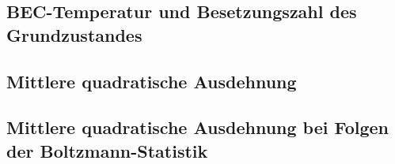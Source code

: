 \subsection{BEC-Temperatur und Besetzungszahl des Grundzustandes}

\fehlt

\subsection{Mittlere quadratische Ausdehnung}

\fehlt

\subsection{Mittlere quadratische Ausdehnung bei Folgen der Boltzmann-Statistik}

\fehlt

\IfFileExists{\bibliographyfile}{
    \printbibliography
}{}



